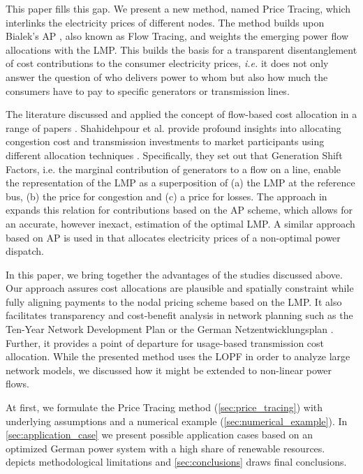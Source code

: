 \documentclass[11pt,twocolumn]{article}
\begin{document}
This paper fills this gap. We present a new method, named Price Tracing, which interlinks the electricity prices of different nodes. The method builds upon Bialek’s \ac{AP} \cite{bialek_tracing_1996}, also known as Flow Tracing, and weights the emerging power flow allocations with the \ac{LMP}. This builds the basis for a transparent disentanglement of cost contributions to the consumer electricity prices, \textit{i.e.} it does not only answer the question of who delivers power to whom but also how much the consumers have to pay to specific generators or transmission lines. 

The literature discussed and applied the concept of flow-based cost allocation in a range of papers \cite{galiana_transmission_2003,shahidehpour_market_2002,meng_investigation_2007,schafer_allocation_2017,nikoukar_transmission_2012,arabali_pricing_2012,wu_locational_2005}. Shahidehpour et al. provide profound insights into allocating congestion cost and transmission investments to market participants using different allocation techniques \cite{shahidehpour_market_2002}. Specifically, they set out that Generation Shift Factors, i.e. the marginal contribution of generators to a flow on a line, enable the representation of the \ac{LMP} as a superposition of (a) the \ac{LMP} at the reference bus, (b) the price for congestion and (c) a price for losses. The approach in \cite{meng_investigation_2007} expands this relation for contributions based on the \ac{AP} scheme, which allows for an accurate, however inexact, estimation of the optimal \ac{LMP}. A similar approach based on \ac{AP} is used in \cite{schafer_allocation_2017} that allocates electricity prices of a non-optimal power dispatch.


In this paper, we bring together the advantages of the studies discussed above. Our approach assures cost allocations are plausible and spatially constraint while fully aligning payments to the nodal pricing scheme based on the \ac{LMP}. It also facilitates transparency and cost-benefit analysis in network planning such as the Ten-Year Network Development Plan \cite{entso-e_completing_2020} or the German Netzentwicklungsplan \cite{bundesnetzagentur_netzentwicklungsplan_2020}. Further, it provides a point of departure for usage-based transmission cost allocation. While the presented method uses the \ac{LOPF} in order to analyze large network models, we discussed how it might be extended to non-linear power flows. 

At first, we formulate the Price Tracing method (\cref{sec:price_tracing}) with underlying assumptions and a numerical example (\cref{sec:numerical_example}). In \cref{sec:application_case} we present possible application cases based on an optimized German power system with a high share of renewable resources.  depicts methodological limitations and \cref{sec:conclusions} draws final conclusions. 
\end{document}

